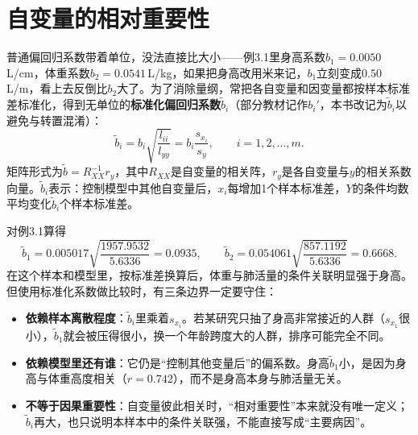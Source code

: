 \section{自变量的相对重要性}
普通偏回归系数带着单位，没法直接比大小——例3.1里身高系数$b_1=0.0050$\,L/cm，体重系数$b_2=0.0541$\,L/kg，如果把身高改用米来记，$b_1$立刻变成$0.50$\,L/m，看上去反倒比$b_2$大了。为了消除量纲，常把各自变量和因变量都按样本标准差标准化，得到无单位的\textbf{标准化偏回归系数}$\widetilde b_i$（部分教材记作$b_i'$，本书改记为$\widetilde b_i$以避免与转置混淆）：
\[
\widetilde b_i=b_i\sqrt{\frac{l_{ii}}{l_{yy}}}=b_i\frac{s_{x_i}}{s_y},\qquad i=1,2,\ldots,m.
\]
矩阵形式为$\widetilde b=R_{XX}^{-1}r_y$，其中$R_{XX}$是自变量的相关阵，$r_y$是各自变量与$y$的相关系数向量。$\widetilde b_i$表示：控制模型中其他自变量后，$x_i$每增加1个样本标准差，$Y$的条件均数平均变化$\widetilde b_i$个样本标准差。

对例3.1算得
\[
\widetilde b_1=0.005017\sqrt{\frac{1957.9532}{5.6336}}=0.0935,\qquad
\widetilde b_2=0.054061\sqrt{\frac{857.1192}{5.6336}}=0.6668.
\]
在这个样本和模型里，按标准差换算后，体重与肺活量的条件关联明显强于身高。但使用标准化系数做比较时，有三条边界一定要守住：
\begin{itemize}
\item \textbf{依赖样本离散程度}：$\widetilde b_i$里乘着$s_{x_i}$。若某研究只抽了身高非常接近的人群（$s_{x_1}$很小），$\widetilde b_1$就会被压得很小，换一个年龄跨度大的人群，排序可能完全不同。
\item \textbf{依赖模型里还有谁}：它仍是“控制其他变量后”的偏系数。身高$\widetilde b_1$小，是因为身高与体重高度相关（$r=0.742$），而不是身高本身与肺活量无关。
\item \textbf{不等于因果重要性}：自变量彼此相关时，“相对重要性”本来就没有唯一定义；$\widetilde b_i$再大，也只说明本样本中的条件关联强，不能直接写成“主要病因”。
\end{itemize}

